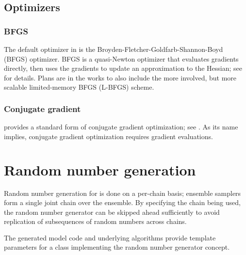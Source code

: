 \documentclass[article]{jss}
\begin{document}
\subsection{Optimizers}

\subsubsection{BFGS}

The default optimizer in  is the
Broyden-Fletcher-Goldfarb-Shannon-Boyd (BFGS) optimizer.  BFGS is a
quasi-Newton optimizer that evaluates gradients directly, then uses
the gradients to update an approximation to the Hessian; see
\citep{NocedalWright:2006} for details.  Plans are in the works to
also include the more involved, but more scalable limited-memory BFGS
(L-BFGS) scheme.

\subsubsection{Conjugate gradient}

 provides a standard form of conjugate gradient
optimization; see \citep{NocedalWright:2006}.  As its name implies,
conjugate gradient optimization requires gradient evaluations.




\section{Random number generation}\label{rng.section}

Random number generation for  is done on a per-chain
basis; ensemble samplers form a single joint chain over the ensemble.  By
specifying the chain being used, the random number generator can be
skipped ahead sufficiently to avoid replication of subsequences of
random numbers across chains.

The generated model code and underlying  algorithms
provide template parameters for a class implementing the 
random number generator concept.  
\end{document}
